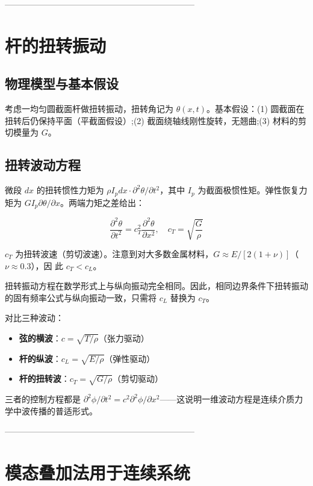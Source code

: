 --------------------------------------------------------------------
\section{杆的扭转振动}

\subsection{物理模型与基本假设}

考虑一均匀圆截面杆做扭转振动，扭转角记为 $\theta(x,t)$。基本假设：(1) 圆截面在扭转后仍保持平面（平截面假设）;(2) 截面绕轴线刚性旋转，无翘曲;(3) 材料的剪切模量为 $G$。

\subsection{扭转波动方程}

微段 $dx$ 的扭转惯性力矩为 $\rho I_p dx \cdot \partial^2\theta/\partial t^2$，其中 $I_p$ 为截面极惯性矩。弹性恢复力矩为 $GI_p \partial\theta/\partial x$。两端力矩之差给出：

\begin{myformula}
\[
\frac{\partial^2\theta}{\partial t^2} = c_T^2\frac{\partial^2\theta}{\partial x^2}, \quad c_T = \sqrt{\frac{G}{\rho}}
\]
\end{myformula}

$c_T$ 为扭转波速（剪切波速）。注意到对大多数金属材料，$G \approx E/[2(1+\nu)]$（$\nu\approx 0.3$），因 此 $c_T < c_L$。

扭转振动方程在数学形式上与纵向振动完全相同。因此，相同边界条件下扭转振动的固有频率公式与纵向振动一致，只需将 $c_L$ 替换为 $c_T$。

\begin{remark}
对比三种波动：
\begin{itemize}
    \item \textbf{弦的横波}：$c=\sqrt{T/\rho}$（张力驱动）
    \item \textbf{杆的纵波}：$c_L=\sqrt{E/\rho}$（弹性驱动）
    \item \textbf{杆的扭转波}：$c_T=\sqrt{G/\rho}$（剪切驱动）
\end{itemize}
三者的控制方程都是 $\partial^2\phi/\partial t^2 = c^2\partial^2\phi/\partial x^2$——这说明一维波动方程是连续介质力学中波传播的普适形式。
\end{remark}

--------------------------------------------------------------------
\section{模态叠加法用于连续系统}

